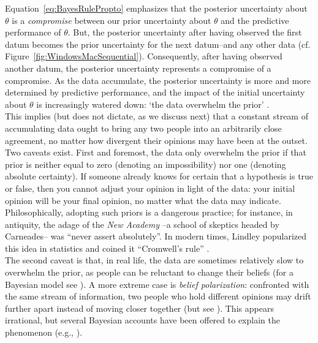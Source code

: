 Equation~\ref{eq:BayesRulePropto} emphasizes that the posterior uncertainty about $\theta$ is a \emph{compromise} between our prior uncertainty about $\theta$ and the predictive performance of $\theta$. But, the posterior uncertainty after having observed the first datum becomes the prior uncertainty for the next datum--and any other data (cf. Figure~\ref{fig:WindowsMacSequential}). Consequently, after having observed another datum, the posterior uncertainty represents a compromise of a compromise. As the data accumulate, the posterior uncertainty is more and more determined by predictive performance, and the impact of the initial uncertainty about $\theta$ is increasingly watered down: `the data overwhelm the prior' \parencite{WrinchJeffreys1919}. \\

This implies (but does not dictate, as we discuss next) that a constant stream of accumulating data ought to bring any two people into an arbitrarily close agreement, no matter how divergent their opinions may have been at the outset. Two caveats exist. First and foremost, the data only overwhelm the prior if that prior is neither equal to zero (denoting an impossibility) nor one (denoting absolute certainty). If someone already knows for certain that a hypothesis is true or false, then you cannot adjust your opinion in light of the data: your initial opinion will be your final opinion, no matter what the data may indicate. Philosophically, adopting such priors is a dangerous practice; for instance, in antiquity, the adage of the \emph{New Academy} --a school of skeptics headed by Carneades-- was ``never assert absolutely''. In modern times, Lindley popularized this idea in statistics and coined it ``Cromwell's rule'' \parencite[p. 104]{Lindley1985}. \\

The second caveat is that, in real life, the data are sometimes relatively slow to overwhelm the prior, as people can be reluctant to change their beliefs (for a Bayesian model see \cite{Gershman2019}). A more extreme case is \emph{belief polarization}: confronted with the same stream of information, two people who hold different opinions may drift further apart instead of moving closer together (but see \cite{Anglin2019}). This appears irrational, but several Bayesian accounts have been offered to explain the phenomenon (e.g., \cite{CookLewandowsky2016,JernEtAl2014}). \\

